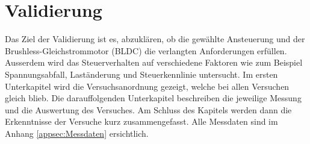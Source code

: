 \section{Validierung}\label{sec:Validierung}
Das Ziel der Validierung ist es, abzuklären, ob die gewählte Ansteuerung und der Brushless-Gleichstrommotor (BLDC) die verlangten Anforderungen erfüllen. Ausserdem wird das Steuerverhalten auf verschiedene Faktoren wie zum Beispiel Spannungsabfall, Laständerung und Steuerkennlinie untersucht.
Im ersten Unterkapitel wird die Versuchsanordnung gezeigt, welche bei allen Versuchen gleich blieb. Die darauffolgenden Unterkapitel beschreiben die jeweilige Messung und die Auswertung des Versuches. Am Schluss des Kapitels werden dann die Erkenntnisse der Versuche kurz zusammengefasst.
Alle Messdaten sind im Anhang \ref{appsec:Messdaten} ersichtlich.












